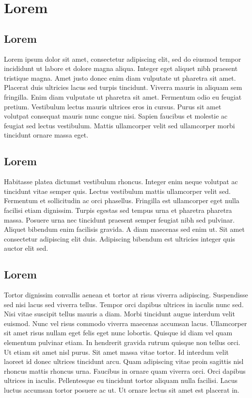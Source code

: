 \section{Lorem}\label{kennzahlenauswertung}\thispagestyle{FooBar}
\subsection{Lorem}
Lorem ipsum dolor sit amet, consectetur adipiscing elit, sed do eiusmod tempor incididunt ut labore et dolore magna aliqua. Integer eget aliquet nibh praesent tristique magna. Amet justo donec enim diam vulputate ut pharetra sit amet. Placerat duis ultricies lacus sed turpis tincidunt. Viverra mauris in aliquam sem fringilla. Enim diam vulputate ut pharetra sit amet. Fermentum odio eu feugiat pretium. Vestibulum lectus mauris ultrices eros in cursus. Purus sit amet volutpat consequat mauris nunc congue nisi. Sapien faucibus et molestie ac feugiat sed lectus vestibulum. Mattis ullamcorper velit sed ullamcorper morbi tincidunt ornare massa eget.
\subsection{Lorem}
Habitasse platea dictumst vestibulum rhoncus. Integer enim neque volutpat ac tincidunt vitae semper quis. Lectus vestibulum mattis ullamcorper velit sed. Fermentum et sollicitudin ac orci phasellus. Fringilla est ullamcorper eget nulla facilisi etiam dignissim. Turpis egestas sed tempus urna et pharetra pharetra massa. Posuere urna nec tincidunt praesent semper feugiat nibh sed pulvinar. Aliquet bibendum enim facilisis gravida. A diam maecenas sed enim ut. Sit amet consectetur adipiscing elit duis. Adipiscing bibendum est ultricies integer quis auctor elit sed.
\subsection{Lorem}
Tortor dignissim convallis aenean et tortor at risus viverra adipiscing. Suspendisse sed nisi lacus sed viverra tellus. Tempor orci dapibus ultrices in iaculis nunc sed. Nisi vitae suscipit tellus mauris a diam. Morbi tincidunt augue interdum velit euismod. Nunc vel risus commodo viverra maecenas accumsan lacus. Ullamcorper sit amet risus nullam eget felis eget nunc lobortis. Quisque id diam vel quam elementum pulvinar etiam. In hendrerit gravida rutrum quisque non tellus orci. Ut etiam sit amet nisl purus. Sit amet massa vitae tortor. Id interdum velit laoreet id donec ultrices tincidunt arcu. Quam adipiscing vitae proin sagittis nisl rhoncus mattis rhoncus urna. Faucibus in ornare quam viverra orci. Orci dapibus ultrices in iaculis. Pellentesque eu tincidunt tortor aliquam nulla facilisi. Lacus luctus accumsan tortor posuere ac ut. Ut ornare lectus sit amet est placerat in.
